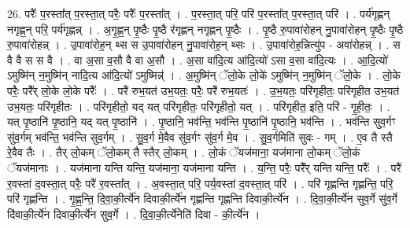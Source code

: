 \documentclass[17pt]{extarticle}
\begin{document}
26. परैः᳚ प॒रस्ता᳚त् प॒रस्ता॒त् परैः॒ परैः᳚ प॒रस्ता᳚त् । . प॒रस्ता॒त् परि॒ परि॑ प॒रस्ता᳚त् प॒रस्ता॒त् परि॑ । . पर्य॑गृह्णन् नगृह्ण॒न् परि॒ पर्य॑गृह्णन्न् । . अ॒गृ॒ह्ण॒न् पृ॒ष्ठैः पृ॒ष्ठै र॑गृह्णन् नगृह्णन् पृ॒ष्ठैः । . पृ॒ष्ठै रु॒पावा॑रोहन् नु॒पावा॑रोहन् पृ॒ष्ठैः पृ॒ष्ठै रु॒पावा॑रोहन्न् । . उ॒पावा॑रोह॒न् थ्स स उ॒पावा॑रोहन् नु॒पावा॑रोह॒न् थ्सः । . उ॒पावा॑रोह॒न्नित्यु॑प - अवा॑रोहन्न् । . स वै वै स स वै । . वा अ॒सा व॒सौ वै वा अ॒सौ । . अ॒सा वा॑दि॒त्य आ॑दि॒त्यो॑ ऽसा व॒सा वा॑दि॒त्यः । . आ॒दि॒त्यो॑ ऽमुष्मि॑न् न॒मुष्मि॑न् नादि॒त्य आ॑दि॒त्यो॑ ऽमुष्मिन्न्॑ । . अ॒मुष्मि॑न् ॅलो॒के लो॒के॑ ऽमुष्मि॑न् न॒मुष्मि॑न् ॅलो॒के । . लो॒के परैः॒ परै᳚र् लो॒के लो॒के परैः᳚ । . परै॑ रुभ॒यत॑ उभ॒यतः॒ परैः॒ परै॑ रुभ॒यतः॑ । . उ॒भ॒यतः॒ परि॑गृहीतः॒ परि॑गृहीत उभ॒यत॑ उभ॒यतः॒ परि॑गृहीतः । . परि॑गृहीतो॒ यद् यत् परि॑गृहीतः॒ परि॑गृहीतो॒ यत् । . परि॑गृहीत॒ इति॒ परि॑ - गृ॒ही॒तः॒ । . यत् पृ॒ष्ठानि॑ पृ॒ष्ठानि॒ यद् यत् पृ॒ष्ठानि॑ । . पृ॒ष्ठानि॒ भव॑न्ति॒ भव॑न्ति पृ॒ष्ठानि॑ पृ॒ष्ठानि॒ भव॑न्ति । . भव॑न्ति सुव॒र्गꣳ सु॑व॒र्गम् भव॑न्ति॒ भव॑न्ति सुव॒र्गम् । . सु॒व॒र्ग मे॒वैव सु॑व॒र्गꣳ सु॑व॒र्ग मे॒व । . सु॒व॒र्गमिति॑ सुवः - गम् । . ए॒व तै स्तै रे॒वैव तैः । . तैर् लो॒कम् ॅलो॒कम् तै स्तैर् लो॒कम् । . लो॒कं ॅयज॑माना॒ यज॑माना लो॒कम् ॅलो॒कं ॅयज॑मानाः । . यज॑माना यन्ति यन्ति॒ यज॑माना॒ यज॑माना यन्ति । . य॒न्ति॒ परैः॒ परै᳚र् यन्ति यन्ति॒ परैः᳚ । . परै॑ र॒वस्ता॑ द॒वस्ता॒त् परैः॒ परै॑ र॒वस्ता᳚त् । . अ॒वस्ता॒त् परि॒ पर्य॒वस्ता॑ द॒वस्ता॒त् परि॑ । . परि॑ गृह्णन्ति गृह्णन्ति॒ परि॒ परि॑ गृह्णन्ति । . गृ॒ह्ण॒न्ति॒ दि॒वा॒की॒र्त्ये॑न दिवाकी॒र्त्ये॑न गृह्णन्ति गृह्णन्ति दिवाकी॒र्त्ये॑न । . दि॒वा॒की॒र्त्ये॑न सुव॒र्गे सु॑व॒र्गे दि॑वाकी॒र्त्ये॑न दिवाकी॒र्त्ये॑न सुव॒र्गे । . दि॒वा॒की॒र्त्ये॑नेति॑ दिवा - की॒र्त्ये॑न । \newline
\end{document}
